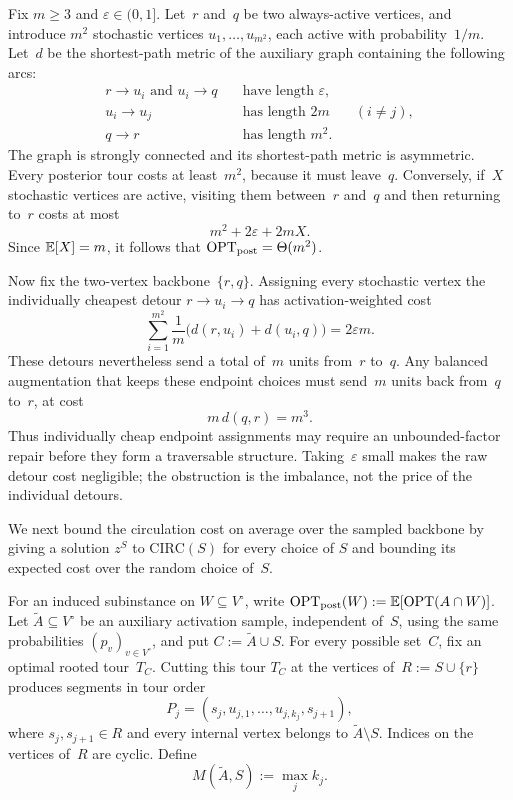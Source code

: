 \documentclass[12pt,a4paper,oneside]{report}
\begin{document}
\begin{remark}
Fix $m\ge3$ and $\varepsilon\in(0,1]$.  Let~$r$ and~$q$ be two always-active
vertices, and introduce $m^2$ stochastic vertices
$u_1,\ldots,u_{m^2}$, each active with probability~$1/m$.  Let~$d$ be the
shortest-path metric of the auxiliary graph containing the following arcs:
\[
\begin{aligned}
    r\to u_i \text{ and } u_i\to q
        &\quad\text{have length }\varepsilon,\\
    u_i\to u_j
        &\quad\text{has length }2m &&(i\ne j),\\
    q\to r
        &\quad\text{has length }m^2.
\end{aligned}
\]
The graph is strongly connected and its shortest-path metric is asymmetric.
Every posterior tour costs at least~$m^2$, because it must leave~$q$.
Conversely, if~$X$ stochastic vertices are active, visiting them between~$r$
and~$q$ and then returning to~$r$ costs at most
\[
    m^2+2\varepsilon+2mX.
\]
Since $\mathbb{E}[X]=m$, it follows that $\operatorname{OPT}_\mathrm{post}=\Theta(m^2)$.

Now fix the two-vertex backbone~$\{r,q\}$.  Assigning every stochastic vertex
the individually cheapest detour $r\to u_i\to q$ has
activation-weighted cost
\[
    \sum_{i=1}^{m^2}\frac1m
      \bigl(d(r,u_i)+d(u_i,q)\bigr)
    =2\varepsilon m.
\]
These detours nevertheless send a total of~$m$ units from~$r$ to~$q$.
Any balanced augmentation that keeps these endpoint choices must send~$m$
units back from~$q$ to~$r$, at cost
\[
    m\,d(q,r)=m^3.
\]
Thus individually cheap endpoint assignments may require an unbounded-factor
repair before they form a traversable structure.  Taking~$\varepsilon$ small
makes the raw detour cost negligible; the obstruction is the imbalance, not
the price of the individual detours.
\end{remark}

We next bound the circulation cost on average over the sampled backbone by giving
a solution $z^S$ to $\mathrm{CIRC}(S)$ for every choice of $S$ and bounding its expected cost
over the random choice of~$S$.

For an induced subinstance on $W\subseteq V^\circ$, write
$\operatorname{OPT}_\mathrm{post}(W):=\mathbb{E}[\operatorname{OPT}(A\cap W)]$.
Let $\widetilde A\subseteq V^\circ$ be an auxiliary activation sample,
independent of~$S$, using the same probabilities
$(p_v)_{v\in V^\circ}$, and put $C:=\widetilde A\cup S$.  For every possible
set~$C$, fix an optimal rooted tour~$T_C$.  Cutting this tour $T_C$ at the vertices
of~$R:=S\cup\{r\}$ produces segments in tour order
\[
    P_j=(s_j,u_{j,1},\ldots,u_{j,k_j},s_{j+1}),
\]
where $s_j,s_{j+1}\in R$ and every internal vertex belongs to
$\widetilde A\setminus S$.  Indices on the vertices of~$R$ are cyclic.  Define
\[
    M(\widetilde A,S):=\max_j k_j.
\]
\end{document}
